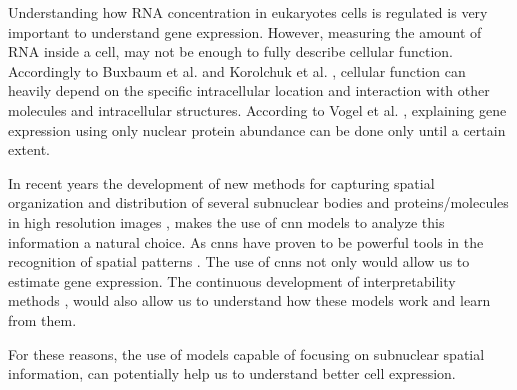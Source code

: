 
\glsresetall

Understanding how RNA concentration in eukaryotes cells is regulated is very important to understand gene expression. However, measuring the amount of RNA inside a cell, may not be enough to fully describe cellular function. Accordingly to Buxbaum et al. \cite{Buxbaum_2014} and Korolchuk et al. \cite{Korolchuk2011}, cellular function can heavily depend on the specific intracellular location and interaction with other molecules and intracellular structures.
According to Vogel et al. \cite{vogel2010sequence}, explaining gene expression using only nuclear protein abundance can be done only until a certain extent.

In recent years the development of new methods for capturing spatial organization and distribution of several subnuclear bodies and proteins/molecules in high resolution images \cite{Guteaar7042}, makes the use of \gls{cnn} models to analyze this information a natural choice. As \glspl{cnn} have proven to be powerful tools in the recognition of spatial patterns \cite{krizhevsky2012imagenet}.
The use of \glspl{cnn} not only would allow us to estimate gene expression. The continuous development of interpretability methods \cite{hooker2018benchmark}, would also allow us to understand how these models work and learn from them.

For these reasons, the use of models capable of focusing on subnuclear spatial information, can potentially help us to understand better cell expression.
